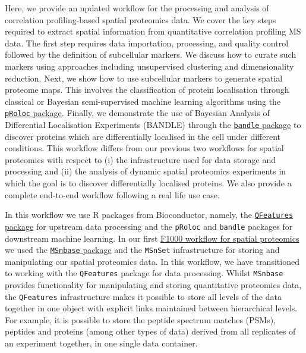 \documentclass[9pt,a4paper,]{extarticle}
\begin{document}
Here, we provide an updated workflow for the processing and analysis of
correlation profiling-based spatial proteomics data. We cover the key steps
required to extract spatial information from quantitative correlation profiling
MS data. The first step requires data importation, processing, and quality control
followed by the definition of subcellular markers. We discuss how to
curate such markers using approaches including unsupervised clustering and
dimensionality reduction. Next, we show how to use subcellular markers to generate
spatial proteome maps. This involves the classification of protein localisation
through classical or Bayesian semi-supervised machine learning algorithms using the
\href{https://www.bioconductor.org/packages/release/bioc/html/pRoloc.html}{\texttt{pRoloc} package}.
Finally, we demonstrate the use of Bayesian Analysis of Differential Localisation
Experiments (BANDLE) \citep{Crook2022} through the \href{https://www.bioconductor.org/packages/release/bioc/html/bandle.html}{\texttt{bandle} package}
to discover proteins which are differentially localised in the cell under different
conditions. This workflow differs from our previous
two workflows for spatial proteomics \citep{Breckels2018, Crook2019} with respect to
(i) the infrastructure used for data storage and processing and (ii) the analysis
of dynamic spatial proteomics experiments in which the goal is to discover
differentially localised proteins. We also provide a complete end-to-end workflow
following a real life use case.

In this workflow we use R packages from Bioconductor, namely, the
\href{https://bioconductor.org/packages/release/bioc/html/QFeatures.html}{\texttt{QFeatures} package}
for upstream data processing and the \texttt{pRoloc} and \texttt{bandle} packages for downstream
machine learning. In our first \href{https://f1000research.com/articles/5-2926}{F1000 workflow for spatial proteomics}
\citep{Breckels2018} we used the \href{https://bioconductor.org/packages/release/bioc/html/MSnbase.html}{\texttt{MSnbase} package}
and the \texttt{MSnSet} infrastructure for storing and manipulating our spatial
proteomics data. In this workflow, we have transitioned to working with the
\texttt{QFeatures} package for data processing. Whilst \texttt{MSnbase} provides functionality
for manipulating and storing quantitative proteomics data, the \texttt{QFeatures}
infrastructure makes it possible to store all levels of the data together in one
object with explicit links maintained between hierarchical levels. For example,
it is possible to store the peptide spectrum matches (PSMs), peptides and proteins
(among other types of data) derived from all replicates of an experiment together,
in one single data container.
\end{document}

